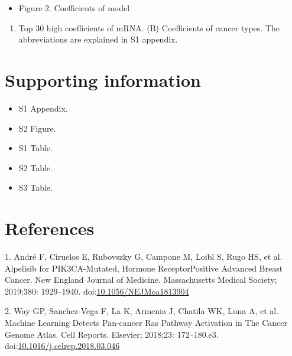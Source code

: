 \documentclass[10pt,letterpaper]{article}
\providecommand{\tightlist}{%
  \setlength{\itemsep}{0pt}\setlength{\parskip}{0pt}}
\begin{document}
\begin{itemize}
\tightlist
\item
  Figure 2. Coefficients of model
\end{itemize}

\begin{enumerate}
\def\labelenumi{(\Alph{enumi})}
\tightlist
\item
  Top 30 high coefficients of mRNA. (B) Coefficients of cancer types.
  The abbreviations are explained in S1 appendix.
\end{enumerate}

\hypertarget{supporting-information}{%
\section{Supporting information}\label{supporting-information}}

\begin{itemize}
\tightlist
\item
  S1 Appendix.\\
\item
  S2 Figure.\\
\item
  S1 Table.\\
\item
  S2 Table.\\
\item
  S3 Table.
\end{itemize}

\hypertarget{references}{%
\section*{References}\label{references}}

\hypertarget{refs}{}
\leavevmode\hypertarget{ref-andre_2019_alpelisib_nengljmeda}{}%
1. André F, Ciruelos E, Rubovszky G, Campone M, Loibl S, Rugo HS, et al.
Alpelisib for PIK3CA-Mutated, Hormone ReceptorPositive Advanced Breast
Cancer. New England Journal of Medicine. Massachusetts Medical Society;
2019;380: 1929--1940.
doi:\href{https://doi.org/10.1056/NEJMoa1813904}{10.1056/NEJMoa1813904}

\leavevmode\hypertarget{ref-way_2018_machine_cellreports}{}%
2. Way GP, Sanchez-Vega F, La K, Armenia J, Chatila WK, Luna A, et al.
Machine Learning Detects Pan-cancer Ras Pathway Activation in The Cancer
Genome Atlas. Cell Reports. Elsevier; 2018;23: 172--180.e3.
doi:\href{https://doi.org/10.1016/j.celrep.2018.03.046}{10.1016/j.celrep.2018.03.046}
\end{document}

